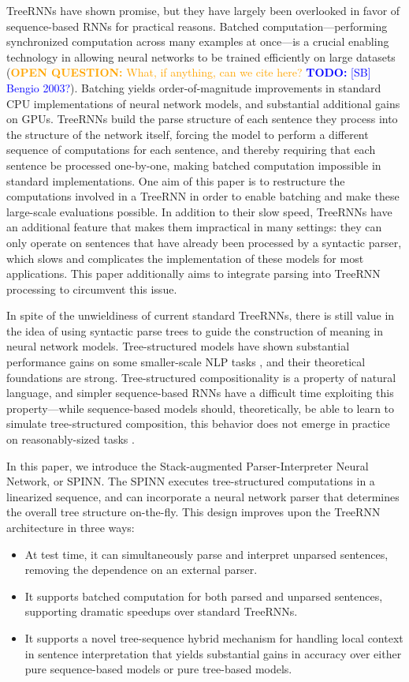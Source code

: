 \documentclass[11pt]{article}
\newcommand\todo[1]{\textcolor{blue}{\textbf{TODO:} #1}}
\newcommand\question[1]{\textcolor{orange}{\textbf{OPEN QUESTION:} #1}}
\begin{document}
TreeRNNs have shown promise, but they have largely been overlooked in favor of sequence-based RNNs for practical reasons. Batched computation---performing synchronized computation across many examples at once---is a crucial enabling technology in allowing neural networks to be trained efficiently on large datasets (\question{What, if anything, can we cite here?} \todo{[SB] Bengio 2003?}). Batching yields order-of-magnitude improvements in standard CPU implementations of neural network models, and substantial additional gains on GPUs. TreeRNNs build the parse structure of each sentence they process into the structure of the network itself, forcing the model to perform a different sequence of computations for each sentence, and thereby requiring that each sentence be processed one-by-one, making batched computation impossible in standard implementations. One aim of this paper is to restructure the computations involved in a TreeRNN in order to enable batching and make these large-scale evaluations possible.  In addition to their slow speed, TreeRNNs have an additional feature that makes them impractical in many settings: they can only operate on sentences that have already been processed by a syntactic parser, which slows and complicates the implementation of these models for most applications. This paper additionally aims to integrate parsing into TreeRNN processing to circumvent this issue.

In spite of the unwieldiness of current standard TreeRNNs, there is still value in the idea of using syntactic parse trees to guide the construction of meaning in neural network models. Tree-structured models have shown substantial performance gains on some smaller-scale NLP tasks \citep{tai2015improved,li2015tree}, and their theoretical foundations are strong. Tree-structured compositionality is a property of natural language, and simpler sequence-based RNNs have a difficult time exploiting this property---while sequence-based models should, theoretically, be able to learn to simulate tree-structured composition, this behavior does not emerge in practice on reasonably-sized tasks \citep{bowman2015trees}. 

In this paper, we introduce the Stack-augmented Parser-Interpreter Neural Network, or SPINN. The SPINN executes tree-structured computations in a linearized sequence, and can incorporate a neural network parser that determines the overall tree structure on-the-fly. This design improves upon the TreeRNN architecture in three ways:
\begin{itemize}
\item At test time, it can simultaneously parse and interpret unparsed sentences, removing the dependence on an external parser.
\item It supports batched computation for both parsed and unparsed sentences, supporting dramatic speedups over standard TreeRNNs.
\item It supports a novel tree-sequence hybrid mechanism for handling local context in sentence interpretation that yields substantial gains in accuracy over either pure sequence-based models or pure tree-based models.
\end{itemize}
\end{document}
